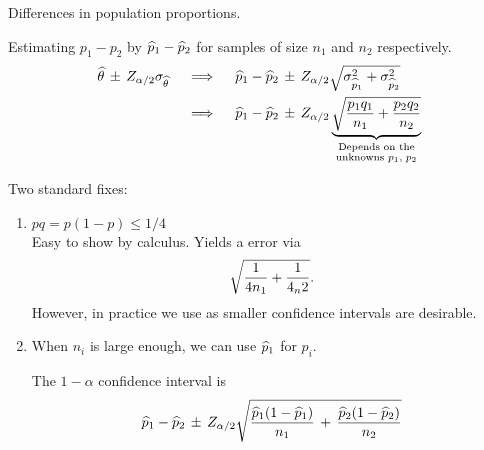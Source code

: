     \disc* Differences in population proportions.

    \nl Estimating $p_1 - p_2$ by $\widehat{p}_1 - \widehat{p}_2$ for samples of size $n_1$ and $n_2$ respectively.
    \begin{align}
        \widehat{\theta}\,\pm\, Z_{\alpha / 2} \sigma_{\widehat{\theta}} &\quad\implies\quad \widehat{p}_1 - \widehat{p}_2 \,\pm\, Z_{\alpha/2} \sqrt{\sigma_{\widehat{p}_1}^2 + \sigma_{\widehat{p}_2}^2 } \notag\\
        &\quad\implies\quad \widehat{p}_1 - \widehat{p}_2 \,\pm\, Z_{\alpha/2} \underbrace{\sqrt{\frac{p_1q_1}{n_1}+\frac{p_2q_2}{n_2}}}_{\substack{\text{Depends on the} \\ \text{unknowns } p_1,\; p_2}}\notag
    \end{align}

    
    \nl Two standard fixes:
    \begin{enumerate}[label=\textcircled{\raisebox{-1pt}{\arabic*}}]
        \item $pq = p(1-p) \leq 1/4$\\
            Easy to show by calculus. Yields a  error via
            $$\sqrt{\over{4n_1}+\over{4_n2}}.$$
            However, in practice we use  as smaller confidence intervals are desirable.
        
            \vspace{0.35in}
            \item When $n_i$ is large enough, we can use $\widehat{p}_1$ for $p_i$.
        
        \nl The $1-\alpha$ confidence interval is
        $$\widehat{p}_1-\widehat{p}_2 \,\pm\, Z_{\alpha/2}\sqrt{ \frac{\widehat{p}_1(1-\widehat{p}_1)}{n_1}   \, + \, \frac{\widehat{p}_2(1-\widehat{p}_2)}{n_2}  } $$
    \end{enumerate}
           
